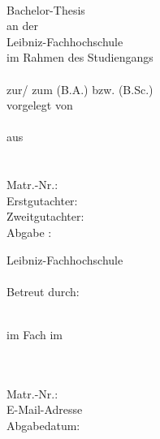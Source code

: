 \documentclass[a4paper, 11pt, german ]{article}
\def\True{1}
\begin{document}



\begin{titlepage}
\if\BachlorThesis\True
	\vspace*{20ex}
	\begin{center}
		
		\textbf{\thetitle}\\
		\vspace{10ex}
		Bachelor-Thesis\\
		an der \\
		Leibniz-Fachhochschule\\
		im Rahmen des Studiengangs \\
		\Studiengang \\
		zur/ zum \Abschlussbezeinung (B.A.) bzw. (B.Sc.) \\
	
		\vspace{1ex}
		vorgelegt von \\
		\theauthor \\
		aus\\
		\Addresse\\
		\Email\\
		
		\vspace{1ex}
		Matr.-Nr.: \MatrNummer\\
		
		\vspace{10ex}
		Erstgutachter: \Pruefer \\
		Zweitgutachter: \ZweitGutachter \\
		\vspace{1ex}
		Abgabe : \thedate
	\end{center}

\else


\raggedright
\vspace*{20ex}
Leibniz-Fachhochschule\\
\Studiengang\\
Betreut durch: \Pruefer

\vspace{10ex}
\begin{center}
	\ArtArbeit\\
	\vspace{1ex}
	im Fach \Modul im \Semester\\
	
	\vspace{10ex}
	\textbf{\thetitle}

\end{center}

\vspace{10ex}
\theauthor\\
\Addresse\\
Matr.-Nr.: \MatrNummer\\
\vspace{1ex}
E-Mail-Adresse \Email\\
\vspace{3ex}
Abgabedatum: \thedate

\fi
\restoregeometry
\end{titlepage}
\end{document}
